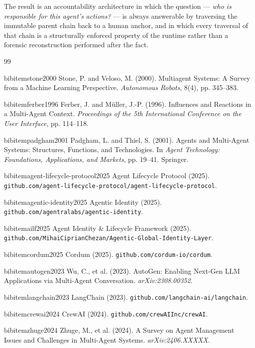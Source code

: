 The result is an accountability architecture in which the question — \emph{who is responsible for this agent's actions?} — is always answerable by traversing the immutable parent chain back to a human anchor, and in which every traversal of that chain is a structurally enforced property of the runtime rather than a forensic reconstruction performed after the fact.

\begin{thebibliography}{99}

bibitem{stone2000}
Stone, P. and Veloso, M. (2000). Multiagent Systems: A Survey from a Machine Learning Perspective. \textit{Autonomous Robots}, 8(4), pp. 345--383.

bibitem{ferber1996}
Ferber, J. and M\"uller, J.-P. (1996). Influences and Reactions in a Multi-Agent Context. \textit{Proceedings of the 5th International Conference on the User Interface}, pp. 114--118.

bibitem{padgham2001}
Padgham, L. and Thiel, S. (2001). Agents and Multi-Agent Systems: Structures, Functions, and Technologies. In \textit{Agent Technology: Foundations, Applications, and Markets}, pp. 19--41. Springer.

bibitem{agent-lifecycle-protocol2025}
Agent Lifecycle Protocol (2025). \texttt{github.com/agent-lifecycle-protocol/agent-lifecycle-protocol}.

bibitem{agentic-identity2025}
Agentic Identity (2025). \texttt{github.com/agentralabs/agentic-identity}.

bibitem{ailf2025}
Agent Identity \& Lifecycle Framework (2025). \texttt{github.com/MihaiCiprianChezan/Agentic-Global-Identity-Layer}.

bibitem{cordum2025}
Cordum (2025). \texttt{github.com/cordum-io/cordum}.

bibitem{autogen2023}
Wu, C., et al. (2023). AutoGen: Enabling Next-Gen LLM Applications via Multi-Agent Conversation. \textit{arXiv:2308.00352}.

bibitem{langchain2023}
LangChain (2023). \texttt{github.com/langchain-ai/langchain}.

bibitem{crewai2024}
CrewAI (2024). \texttt{github.com/crewAIInc/crewAI}.

bibitem{zhuge2024}
Zhuge, M., et al. (2024). A Survey on Agent Management Issues and Challenges in Multi-Agent Systems. \textit{arXiv:2406.XXXXX}.


\end{thebibliography}
